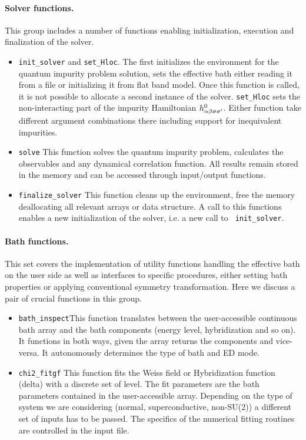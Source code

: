 \documentclass[edipack_sp.tex]{subfiles}
\begin{document}
\paragraph{{\bf Solver functions}.}
This group includes a number of functions enabling initialization,
execution and finalization  of the \NAME solver.
\begin{itemize}
  \item {\tt init\_solver} and {\tt set\_Hloc}. The first 
    initializes the \NAME environment for the quantum impurity problem
    solution, sets the effective bath either reading it from a file or
    initializing it from flat band model. Once this function is
    called, it is not possible to allocate a second instance of the solver.
    {\tt set\_Hloc} sets the
    non-interacting part of the impurity Hamiltonian $h^0_{\alpha\beta\sigma\sigma'}$. 
    Either function take different argument combinations there
    including support for inequivalent impurities.

  \item {\tt solve} This function solves the quantum impurity problem,
    calculates the observables and any dynamical correlation
    function. All results remain stored in the memory and can be accessed
    through input/output functions.

  \item {\tt finalize\_solver} This function cleans up the \NAME
    environment, free the memory deallocating all relevant arrays or
    data structure. A call to this functions enables a new
    initialization of the solver, i.e. a new call to {\tt
      init\_solver}.  
  \end{itemize}


\paragraph{{\bf Bath functions}.}
This set covers the implementation of utility functions handling the
effective bath on the user side as well as interfaces to specific
\NAME procedures, either setting bath properties or applying
conventional symmetry transformation. Here we discuss 
a pair of crucial functions in this group.
\begin{itemize}
\item {\tt bath\_inspect}This function translates between the
  user-accessible continuous bath array and the bath components
  (energy level, hybridization and so on). It functions in both ways,
  given the array returns the components and vice-versa. It
  autonomously determines the type of bath and ED mode.

\item {\tt chi2\_fitgf}
  This function fits the Weiss field or Hybridization function (delta)
  with a discrete set of level. The fit parameters are the bath
  parameters contained in the user-accessible array. Depending on the
  type of system we are considering (normal, superconductive,
  non-SU(2)) a different set of inputs has to be passed. The specifics
  of the numerical fitting routines are controlled in the input file.
  \end{itemize}
\end{document}
